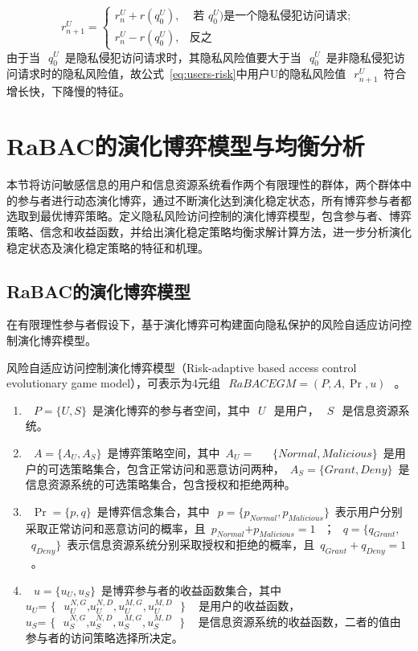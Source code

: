 \begin{equation}\label{eq:users-risk}
r_{n+1}^{U}=\begin{cases}
r_{n}^{U}+r(q_0^U), & \text{ 若 } q_0^U) \text{是一个隐私侵犯访问请求}; \\ 
r_{n}^{U}-r(q_0^U),& \text{反之}
\end{cases}
\end{equation} 
由于当~$~q_{0}^{U}$~是隐私侵犯访问请求时，其隐私风险值要大于当~$~q_{0}^{U}$~是非隐私侵犯访问请求时的隐私风险值，故公式~\ref{eq:users-risk}中用户U的隐私风险值~$~r_{n+1}^{U}$~符合增长快，下降慢的特征。

\section{RaBAC的演化博弈模型与均衡分析}
\label{sec:evolutionary-game-model}
本节将访问敏感信息的用户和信息资源系统看作两个有限理性的群体，两个群体中的参与者进行动态演化博弈，通过不断演化达到演化稳定状态，所有博弈参与者都选取到最优博弈策略。定义隐私风险访问控制的演化博弈模型，包含参与者、博弈策略、信念和收益函数，并给出演化稳定策略均衡求解计算方法，进一步分析演化稳定状态及演化稳定策略的特征和机理。

\subsection{RaBAC的演化博弈模型}
\label{subsec:evolutionary-game-model}
在有限理性参与者假设下，基于演化博弈可构建面向隐私保护的风险自适应访问控制演化博弈模型。
\begin{definition}
	风险自适应访问控制演化博弈模型（Risk-adaptive based access control evolutionary game model），可表示为4元组~$~RaBACEGM=(P,A,\Pr ,u)~$~。
	\begin{enumerate}
		\item ~$~P=\{U,S\}$~是演化博弈的参与者空间，其中~$~U~$~是用户，~$~S~$~是信息资源系统。
		\item ~$~A=\{{{A}_{U}},{{A}_{S}}\}$~是博弈策略空间，其中~${{A}_{U}}=~$~ ~$\{Normal,Malicious\}$~是用户的可选策略集合，包含正常访问和恶意访问两种，~${{A}_{S}}=\{Grant,Deny\}$~是信息资源系统的可选策略集合，包含授权和拒绝两种。
		\item ~$\Pr =\{p,q\}$~是博弈信念集合，其中~$~p=\{{{p}_{Normal}},{{p}_{Malicious}}\}$~表示用户分别采取正常访问和恶意访问的概率，且~${{p}_{Normal}}\text{+}{{p}_{Malicious}}=1~$~；~$~q=\{{{q}_{Grant}},~$~ ~${{q}_{Deny}}\}$~表示信息资源系统分别采取授权和拒绝的概率，且~${{q}_{Grant}}+{{q}_{Deny}}=1~$~。
		\item ~$~u=\{{{u}_{U}},{{u}_{S}}\}$~是博弈参与者的收益函数集合，其中~${{u}_{U}}\text{= }\!\!\{\!\!\text{ }u_{U}^{N,G}\text{,}u_{U}^{N,D},u_{U}^{M,G},u_{U}^{M,D}\text{ }\!\!\}\!\!\text{ }$~是用户的收益函数，~${{u}_{S}}\text{= }\!\!\{\!\!\text{ }u_{S}^{N,G}\text{,}u_{S}^{N,D},u_{S}^{M,G},u_{S}^{M,D}\text{ }\!\!\}\!\!\text{ }$~是信息资源系统的收益函数，二者的值由参与者的访问策略选择所决定。
		
	\end{enumerate}
\end{definition}

